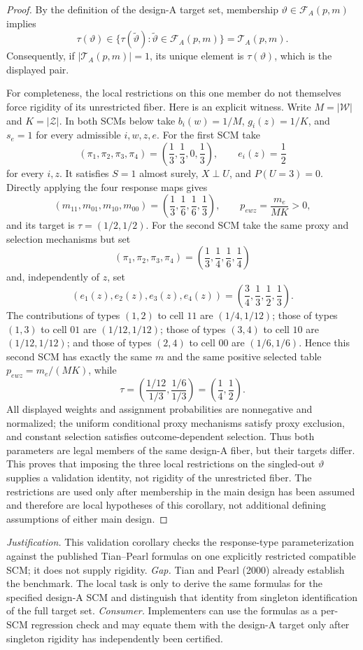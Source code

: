 \documentclass{article}
\begin{document}
\begin{proof}
By the definition of the design-A target set, membership \(\vartheta\in\mathcal F_A(p,m)\) implies
\[
 \tau(\vartheta)\in
 \{\tau(\widetilde\vartheta):\widetilde\vartheta\in\mathcal F_A(p,m)\}
 =\mathcal T_A(p,m).
\]
Consequently, if \(\lvert\mathcal T_A(p,m)\rvert=1\), its unique element is \(\tau(\vartheta)\), which is the displayed pair.

For completeness, the local restrictions on this one member do not themselves force rigidity of its unrestricted fiber.  Here is an explicit witness.  Write \(M=\lvert\mathcal W\rvert\) and \(K=\lvert\mathcal Z\rvert\).  In both SCMs below take \(b_i(w)=1/M\), \(g_i(z)=1/K\), and \(s_e=1\) for every admissible \(i,w,z,e\).  For the first SCM take
\[
 (\pi_1,\pi_2,\pi_3,\pi_4)=\left(\frac13,\frac13,0,\frac13\right),
 \qquad e_i(z)=\frac12
\]
for every \(i,z\).  It satisfies \(S=1\) almost surely, \(X\perp U\), and \(P(U=3)=0\).  Directly applying the four response maps gives
\[
 (m_{11},m_{01},m_{10},m_{00})
 =\left(\frac13,\frac16,\frac16,\frac13\right),
 \qquad
 p_{ewz}=\frac{m_e}{MK}>0,
\]
and its target is \(\tau=(1/2,1/2)\).  For the second SCM take the same proxy and selection mechanisms but set
\[
 (\pi_1,\pi_2,\pi_3,\pi_4)
 =\left(\frac13,\frac14,\frac16,\frac14\right)
\]
and, independently of \(z\), set
\[
 (e_1(z),e_2(z),e_3(z),e_4(z))
 =\left(\frac34,\frac13,\frac12,\frac13\right).
\]
The contributions of types \((1,2)\) to cell \(11\) are \((1/4,1/12)\); those of types \((1,3)\) to cell \(01\) are \((1/12,1/12)\); those of types \((3,4)\) to cell \(10\) are \((1/12,1/12)\); and those of types \((2,4)\) to cell \(00\) are \((1/6,1/6)\).  Hence this second SCM has exactly the same \(m\) and the same positive selected table \(p_{ewz}=m_e/(MK)\), while
\[
 \tau=\left(\frac{1/12}{1/3},\frac{1/6}{1/3}\right)
 =\left(\frac14,\frac12\right).
\]
All displayed weights and assignment probabilities are nonnegative and normalized; the uniform conditional proxy mechanisms satisfy proxy exclusion, and constant selection satisfies outcome-dependent selection.  Thus both parameters are legal members of the same design-A fiber, but their targets differ.  This proves that imposing the three local restrictions on the singled-out \(\vartheta\) supplies a validation identity, not rigidity of the unrestricted fiber.  The restrictions are used only after membership in the main design has been assumed and therefore are local hypotheses of this corollary, not additional defining assumptions of either main design.
\end{proof}
\par\smallskip\noindent \textit{Justification.} This validation corollary checks the response-type parameterization against the published Tian--Pearl formulas on one explicitly restricted compatible SCM; it does not supply rigidity. \textit{Gap.} Tian and Pearl (2000) already establish the benchmark. The local task is only to derive the same formulas for the specified design-A SCM and distinguish that identity from singleton identification of the full target set. \textit{Consumer.} Implementers can use the formulas as a per-SCM regression check and may equate them with the design-A target only after singleton rigidity has independently been certified.
\end{document}
